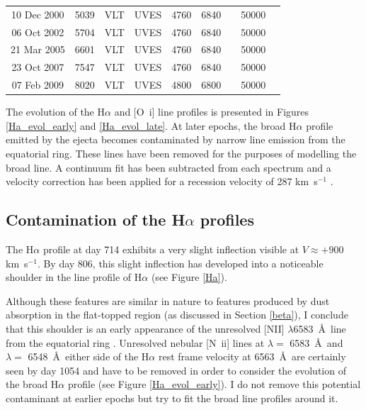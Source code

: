 {\begin{landscape}
\begin{table}
\begin{tabular}{@{} ccccccccl @{}}
10 Dec 2000 & 5039 & VLT & UVES & 4760 & 6840 &  & 50000 & \citet{Groeningsson2006, Groeningsson2007}\\
06 Oct 2002 & 5704 & VLT & UVES & 4760 & 6840 &  & 50000 & \citet{Groeningsson2006, Groeningsson2007, Groningsson2008}\\
21 Mar 2005 & 6601 & VLT & UVES & 4760 & 6840 &  & 50000 &\citet{Groeningsson2006, Groeningsson2007}\\
23 Oct 2007 & 7547 & VLT & UVES & 4760 & 6840 &  & 50000 & \citet{Groeningsson2007}\\
07 Feb 2009 & 8020 & VLT & UVES & 4800 & 6800 &  & 50000 & \citet{Tziamtzis2010}\\
    \hline
  \end{tabular}
\end{table}
\end{landscape}
}
\setlength{\tabcolsep}{12pt}

The evolution of the H$\alpha$ and [O~{\sc i}] line profiles is presented 
in Figures \ref{Ha_evol_early} and \ref{Ha_evol_late}.  At later epochs, 
the broad H$\alpha$ profile emitted by the ejecta becomes contaminated by 
narrow line emission from the equatorial ring.  These lines have been 
removed for the purposes of modelling the broad line. A continuum fit has 
been subtracted from each spectrum and a velocity correction has been 
applied for a recession velocity of 287 km~s$^{-1}$ 
\citep{Groningsson2008}.




\subsection{Contamination of the H$\alpha$ profiles}

The H$\alpha$ profile at day 714 exhibits a very slight inflection visible 
at $V \approx +900$ km~s$^{-1}$.  By day 806, this slight inflection has 
developed into a noticeable shoulder in the line profile of H$\alpha$ (see 
Figure \ref{Ha}).




Although these features are similar in nature to features produced by dust 
absorption in the flat-topped region (as discussed in Section \ref{beta}), 
I conclude that this shoulder is an early appearance of the unresolved 
[NII] $\lambda$6583~\AA\ line from the equatorial ring \citep{Kozma1998b}.  Unresolved nebular [N~{\sc ii}] lines at $\lambda=$ 6583~\AA\ and 
$\lambda=$ 6548~\AA\ either side of the H$\alpha$ rest frame velocity at 
6563~\AA\ are certainly seen by day 1054 
and have to be removed in order to consider the evolution of the broad 
H$\alpha$ profile (see Figure \ref{Ha_evol_early}). I do not remove this 
potential contaminant at earlier epochs but try to fit the broad line 
profiles around it.





